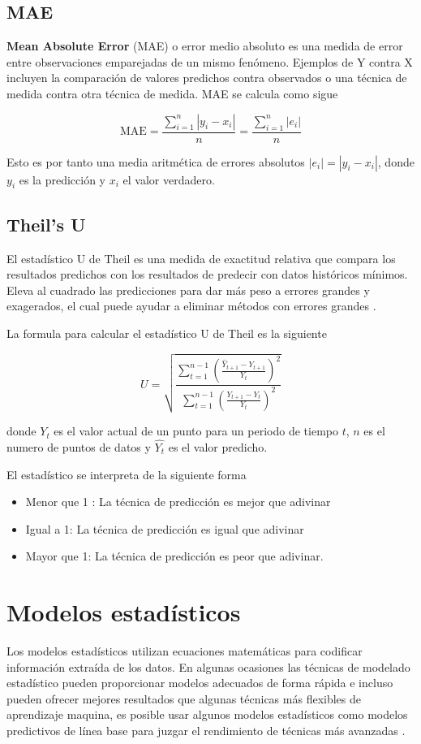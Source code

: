 \subsection{MAE}
\textbf{Mean Absolute Error} (MAE) o error medio absoluto es una medida de error entre observaciones emparejadas de un mismo fenómeno. Ejemplos de Y contra X incluyen la comparación de valores predichos contra observados o una técnica de medida contra otra técnica de medida. MAE se calcula como sigue

\[
\mathrm{MAE}=\frac{\sum_{i=1}^{n}\left|y_{i}-x_{i}\right|}{n}=\frac{\sum_{i=1}^{n}\left|e_{i}\right|}{n}
\] 

Esto es por tanto una media aritmética de errores absolutos $\left|e_{i}\right| = \left|y_{i}-x_{i}\right|$, donde $y_i$ es la predicción y $x_i$ el valor verdadero.

\subsection{Theil's U}

El estadístico U de Theil es una medida de exactitud relativa que compara los resultados predichos con los resultados de predecir con datos históricos mínimos. Eleva al cuadrado las predicciones para dar más peso a errores grandes y exagerados, el cual puede ayudar a eliminar métodos con errores grandes \parencite{OracleCrystalBall}.

La formula para calcular el estadístico U de Theil es la siguiente

\[
U=\sqrt{\frac{\sum_{t=1}^{n-1}\left(\frac{\hat{Y}_{t+1}-Y_{t+1}}{Y_{t}}\right)^{2}}{\sum_{t=1}^{n-1}\left(\frac{Y_{t+1}-Y_{t}}{Y_{t}}\right)^{2}}}
\]

donde $Y_t$ es el valor actual de un punto para un periodo de tiempo $t$, $n$ es el numero de puntos de datos y $\hat{Y_t}$ es el valor predicho.

El estadístico se interpreta de la siguiente forma

\begin{itemize}
	\item Menor que 1 : La técnica de predicción es mejor que adivinar
	\item  Igual a 1: La técnica de predicción es igual que adivinar
	\item Mayor que 1: La técnica de predicción es peor que adivinar.
\end{itemize}

\section{Modelos estadísticos}
\label{modelosestadisticos}
Los modelos estadísticos utilizan ecuaciones matemáticas para codificar información extraída de los datos. En algunas ocasiones las técnicas de modelado estadístico pueden proporcionar modelos adecuados de forma rápida e incluso pueden ofrecer mejores resultados que algunas técnicas más flexibles de aprendizaje maquina, es posible usar algunos modelos estadísticos como modelos predictivos de línea base para juzgar el rendimiento de técnicas más avanzadas \parencite{IBMDocs2021}. 


